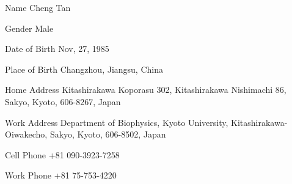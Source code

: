 
\begin{cvskills}

  \cvskill
    {Name} 
    {Cheng Tan}

  \cvskill
    {Gender}
    {Male} 

  \cvskill
    {Date of Birth} 
    {Nov, 27, 1985}

  \cvskill
    {Place of Birth}
    {Changzhou, Jiangsu, China}

  \cvskill
    {Home Address} 
    {Kitashirakawa Koporasu 302, Kitashirakawa Nishimachi 86, Sakyo, Kyoto,
      606-8267, Japan}

  \cvskill
    {Work Address}
    {Department of Biophysics, Kyoto University, Kitashirakawa-Oiwakecho, Sakyo, Kyoto, 606-8502, Japan}

  \cvskill
    {Cell Phone}
    {+81 090-3923-7258}

  \cvskill
    {Work Phone}
    {+81 75-753-4220}


\end{cvskills}
